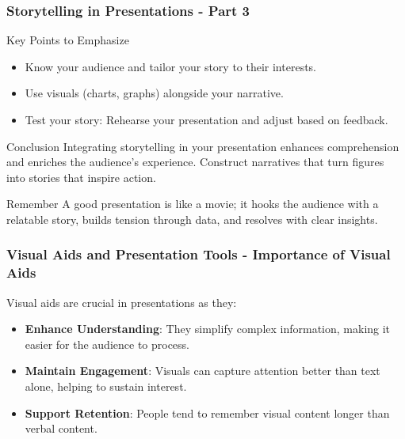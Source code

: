 \documentclass[aspectratio=169]{beamer}
\begin{document}
\begin{frame}[fragile]
    \frametitle{Storytelling in Presentations - Part 3}
    
    \begin{block}{Key Points to Emphasize}
        \begin{itemize}
            \item Know your audience and tailor your story to their interests.
            \item Use visuals (charts, graphs) alongside your narrative.
            \item Test your story: Rehearse your presentation and adjust based on feedback.
        \end{itemize}
    \end{block}
    
    \begin{block}{Conclusion}
        Integrating storytelling in your presentation enhances comprehension and enriches the audience's experience. Construct narratives that turn figures into stories that inspire action.
    \end{block}
    
    \begin{alertblock}{Remember}
        A good presentation is like a movie; it hooks the audience with a relatable story, builds tension through data, and resolves with clear insights.
    \end{alertblock}
\end{frame}

\begin{frame}[fragile]
    \frametitle{Visual Aids and Presentation Tools - Importance of Visual Aids}
    Visual aids are crucial in presentations as they:
    \begin{itemize}
        \item \textbf{Enhance Understanding}: They simplify complex information, making it easier for the audience to process.
        \item \textbf{Maintain Engagement}: Visuals can capture attention better than text alone, helping to sustain interest.
        \item \textbf{Support Retention}: People tend to remember visual content longer than verbal content.
    \end{itemize}
\end{frame}
\end{document}
